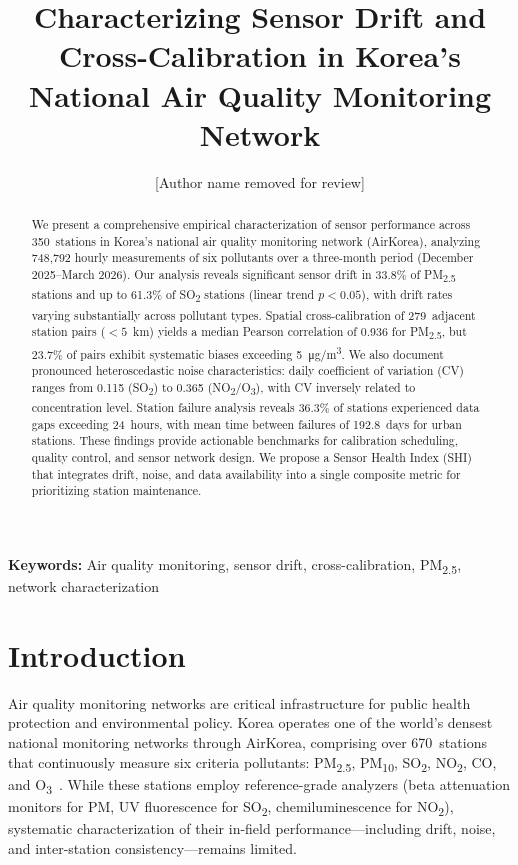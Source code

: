 \documentclass[12pt]{article}
\begin{document}
\title{Characterizing Sensor Drift and Cross-Calibration in Korea's National Air Quality Monitoring Network}

\author[1]{[Author name removed for review]}

\date{}

\maketitle

\begin{abstract}
We present a comprehensive empirical characterization of sensor performance across 350~stations in Korea's national air quality monitoring network (AirKorea), analyzing 748{,}792 hourly measurements of six pollutants over a three-month period (December 2025--March 2026). Our analysis reveals significant sensor drift in 33.8\% of PM\textsubscript{2.5} stations and up to 61.3\% of SO\textsubscript{2} stations (linear trend $p < 0.05$), with drift rates varying substantially across pollutant types. Spatial cross-calibration of 279~adjacent station pairs (${<}5$~km) yields a median Pearson correlation of 0.936 for PM\textsubscript{2.5}, but 23.7\% of pairs exhibit systematic biases exceeding \SI{5}{\micro\gram/\meter\cubed}. We also document pronounced heteroscedastic noise characteristics: daily coefficient of variation (CV) ranges from 0.115 (SO\textsubscript{2}) to 0.365 (NO\textsubscript{2}/O\textsubscript{3}), with CV inversely related to concentration level. Station failure analysis reveals 36.3\% of stations experienced data gaps exceeding 24~hours, with mean time between failures of 192.8~days for urban stations. These findings provide actionable benchmarks for calibration scheduling, quality control, and sensor network design. We propose a Sensor Health Index (SHI) that integrates drift, noise, and data availability into a single composite metric for prioritizing station maintenance.
\end{abstract}

\noindent\textbf{Keywords:} Air quality monitoring, sensor drift, cross-calibration, PM\textsubscript{2.5}, network characterization



\section{Introduction}

Air quality monitoring networks are critical infrastructure for public health protection and environmental policy. Korea operates one of the world's densest national monitoring networks through AirKorea, comprising over 670~stations that continuously measure six criteria pollutants: PM\textsubscript{2.5}, PM\textsubscript{10}, SO\textsubscript{2}, NO\textsubscript{2}, CO, and O\textsubscript{3}~\cite{kim2020airkorea}. While these stations employ reference-grade analyzers (beta attenuation monitors for PM, UV fluorescence for SO\textsubscript{2}, chemiluminescence for NO\textsubscript{2}), systematic characterization of their in-field performance---including drift, noise, and inter-station consistency---remains limited.
\end{document}
